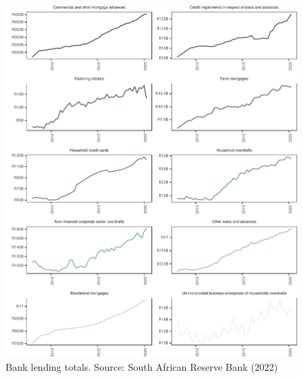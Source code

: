 \documentclass[
]{article}
\begin{document}
\begin{figure}[H]

\includegraphics{Bank_capital_and_bank_lending_files/figure-latex/ba900totals-1} \hfill{}

\caption{Bank lending totals. Source: South African Reserve Bank (2022)}\label{fig:ba900totals}
\end{figure}
\end{document}
